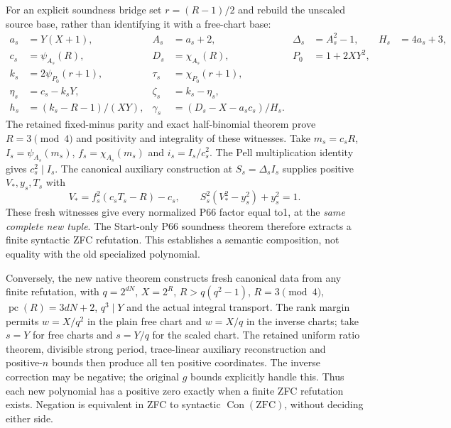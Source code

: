 For an explicit soundness bridge set $r=(R-1)/2$ and rebuild the unscaled
source base, rather than identifying it with a free-chart base:
\begin{align*}
 a_s&=Y(X+1),& A_s&=a_s+2,&\Delta_s&=A_s^2-1,&H_s&=4a_s+3,\\
 c_s&=\psi_{A_s}(R),&D_s&=\chi_{A_s}(R),&P_0&=1+2XY^2,\\
 k_s&=2\psi_{P_0}(r+1),&\tau_s&=\chi_{P_0}(r+1),\\
 \eta_s&=c_s-k_sY,&\zeta_s&=k_s-\eta_s,\\
 h_s&=(k_s-R-1)/(XY),&
 \gamma_s&=(D_s-X-a_sc_s)/H_s.
\end{align*}
The retained fixed-minus parity and exact half-binomial theorem prove
$R=3\pmod4$ and positivity and integrality of these witnesses.
Take $m_s=c_sR$, $I_s=\psi_{A_s}(m_s)$,
$f_s=\chi_{A_s}(m_s)$ and $i_s=I_s/c_s^2$.
The Pell multiplication identity gives $c_s^2\mid I_s$.
The canonical auxiliary construction at $S_s=\Delta_sI_s$ supplies
positive $V_*,y_s,T_s$ with
\[
 V_*=f_s^2(c_sT_s-R)-c_s,\qquad
 S_s^2(V_*^2-y_s^2)+y_s^2=1.
\]
These fresh witnesses give every normalized P66 factor equal to1, at the
\emph{same complete new tuple}. The Start-only P66 soundness theorem therefore
extracts a finite syntactic ZFC refutation. This establishes a semantic
composition, not equality with the old specialized polynomial.

Conversely, the new native theorem constructs fresh canonical data from any
finite refutation, with $q=2^{dN}$, $X=2^R$, $R>q(q^2-1)$,
$R=3\pmod4$, $\operatorname{pc}(R)=3dN+2$, $q^3\mid Y$ and the
actual integral transport. The rank margin permits $w=X/q^2$ in the plain
free chart and $w=X/q$ in the inverse charts; take $s=Y$ for free charts
and $s=Y/q$ for the scaled chart. The retained uniform ratio theorem,
divisible strong period, trace-linear auxiliary reconstruction and
positive-$n$ bounds then produce all ten positive coordinates. The inverse
correction may be negative; the original $g$ bounds explicitly handle this.
Thus each new polynomial has a positive zero exactly when a finite ZFC
refutation exists. Negation is equivalent in ZFC to syntactic
$\operatorname{Con}(\mathrm{ZFC})$, without deciding either side.

